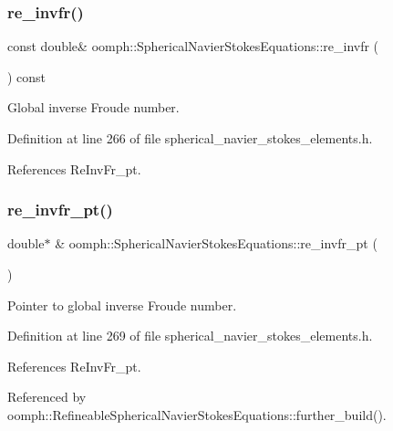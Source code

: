 \subsubsection{\texorpdfstring{re\+\_\+invfr()}{re\_invfr()}}
{\footnotesize\ttfamily const double\& oomph\+::\+Spherical\+Navier\+Stokes\+Equations\+::re\+\_\+invfr (\begin{DoxyParamCaption}{ }\end{DoxyParamCaption}) const\hspace{0.3cm}{\ttfamily [inline]}}



Global inverse Froude number. 



Definition at line 266 of file spherical\+\_\+navier\+\_\+stokes\+\_\+elements.\+h.



References Re\+Inv\+Fr\+\_\+pt.

\mbox{\label{classoomph_1_1SphericalNavierStokesEquations_a8b6d0d4b20bc0f62bac8476b6967cd9f}} 
\subsubsection{\texorpdfstring{re\+\_\+invfr\+\_\+pt()}{re\_invfr\_pt()}}
{\footnotesize\ttfamily double$\ast$ \& oomph\+::\+Spherical\+Navier\+Stokes\+Equations\+::re\+\_\+invfr\+\_\+pt (\begin{DoxyParamCaption}{ }\end{DoxyParamCaption})\hspace{0.3cm}{\ttfamily [inline]}}



Pointer to global inverse Froude number. 



Definition at line 269 of file spherical\+\_\+navier\+\_\+stokes\+\_\+elements.\+h.



References Re\+Inv\+Fr\+\_\+pt.



Referenced by oomph\+::\+Refineable\+Spherical\+Navier\+Stokes\+Equations\+::further\+\_\+build().

